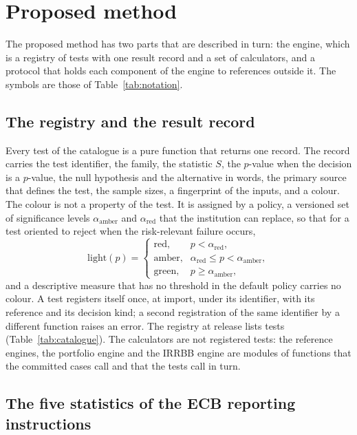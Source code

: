 \section{Proposed method}
\label{sec:proposed-method}

The proposed method has two parts that are described in turn: the engine, which is a registry of tests with one result record and a set of calculators, and a protocol that holds each component of the engine to references outside it. The symbols are those of Table~\ref{tab:notation}.

\subsection{The registry and the result record}

Every test of the catalogue is a pure function that returns one record. The record carries the test identifier, the family, the statistic $S$, the $p$-value when the decision is a $p$-value, the null hypothesis and the alternative in words, the primary source that defines the test, the sample sizes, a fingerprint of the inputs, and a colour. The colour is not a property of the test. It is assigned by a policy, a versioned set of significance levels $\alpha_{\mathrm{amber}}$ and $\alpha_{\mathrm{red}}$ that the institution can replace, so that for a test oriented to reject when the risk-relevant failure occurs,
\begin{equation}
  \mathrm{light}(p)=\begin{cases}
    \text{red}, & p<\alpha_{\mathrm{red}},\\
    \text{amber}, & \alpha_{\mathrm{red}}\le p<\alpha_{\mathrm{amber}},\\
    \text{green}, & p\ge\alpha_{\mathrm{amber}},
  \end{cases}
  \label{eq:light}
\end{equation}
and a descriptive measure that has no threshold in the default policy carries no colour. A test registers itself once, at import, under its identifier, with its reference and its decision kind; a second registration of the same identifier by a different function raises an error. The registry at release \inventoryVersion{} lists \testsTotal{} tests (Table~\ref{tab:catalogue}). The calculators are not registered tests: the reference engines, the portfolio engine and the IRRBB engine are modules of functions that the committed cases call and that the tests call in turn.

\subsection{The five statistics of the ECB reporting instructions}

